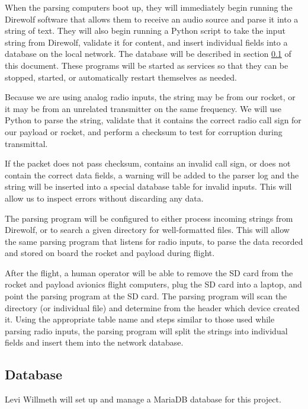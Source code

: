 \documentclass[onecolumn, draftclsnofoot, 10pt, compsoc]{IEEEtran}
\begin{document}
When the parsing computers boot up, they will immediately begin running the Direwolf software that allows them to receive an audio source and parse it into a string of text.\cite{direwolf}  They will also begin running a Python script to take the input string from Direwolf, validate it for content, and insert individual fields into a database on the local network.  The database will be described in section \ref{subsec:database} of this document.  These programs will be started as services so that they can be stopped, started, or automatically restart themselves as needed.\cite{script-as-service}

Because we are using analog radio inputs, the string may be from our rocket, or it may be from an unrelated transmitter on the same frequency.  We will use Python to parse the string, validate that it contains the correct radio call sign for our payload or rocket, and perform a checksum to test for corruption during transmittal.

If the packet does not pass checksum, contains an invalid call sign, or does not contain the correct data fields, a warning will be added to the parser log and the string will be inserted into a special database table for invalid inputs.  This will allow us to inspect errors without discarding any data.

The parsing program will be configured to either process incoming strings from Direwolf, or to search a given directory for well-formatted files.  This will allow the same parsing program that listens for radio inputs, to parse the data recorded and stored on board the rocket and payload during flight.

After the flight, a human operator will be able to remove the SD card from the rocket and payload avionics flight computers, plug the SD card into a laptop, and point the parsing program at the SD card.  The parsing program will scan the directory (or individual file) and determine from the header which device created it.  Using the appropriate table name and steps similar to those used while parsing radio inputs, the parsing program will split the strings into individual fields and insert them into the network database.

\subsection{Database}
\label{subsec:database}

Levi Willmeth will set up and manage a MariaDB database for this project.
\end{document}
